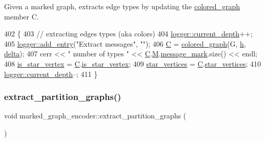 Given a marked graph, extracts edge types by updating the \hyperlink{classcolored__graph}{colored\+\_\+graph} member C. 


\begin{DoxyCode}
402 \{
403   \textcolor{comment}{// extracting edges types (aka colors)}
404   \hyperlink{classlogger_a9d29b49bd318a719a8e85b59eac54fe0}{logger::current\_depth}++;
405   \hyperlink{classlogger_a710163deb17bc81f70d53d285b8ac9ac}{logger::add\_entry}(\textcolor{stringliteral}{"Extract messages"}, \textcolor{stringliteral}{""});
406   \hyperlink{classmarked__graph__encoder_af82bc0653414091291cb75553a407bdb}{C} = \hyperlink{classcolored__graph}{colored\_graph}(G, \hyperlink{classmarked__graph__encoder_ae7f8872c57d2d64e4ca6cc47387b9b58}{h}, \hyperlink{classmarked__graph__encoder_a29dcf42526b12cf7964a556bb1025c9b}{delta});
407   cerr << \textcolor{stringliteral}{" number of types "} << \hyperlink{classmarked__graph__encoder_af82bc0653414091291cb75553a407bdb}{C}.\hyperlink{classcolored__graph_ab72c568fe12f7c849ca6bffb145aec47}{M}.\hyperlink{classgraph__message_a49d9af5150daf0599c29fe18cb032fa5}{message\_mark}.size() << endl;
408   \hyperlink{classmarked__graph__encoder_ac36f6c2430af6fa4d20584569859bb59}{is\_star\_vertex} = \hyperlink{classmarked__graph__encoder_af82bc0653414091291cb75553a407bdb}{C}.\hyperlink{classcolored__graph_ad41163e970530c7e45878d299f0dc961}{is\_star\_vertex};
409   \hyperlink{classmarked__graph__encoder_a08fdf6fcd7dcd8c5d1667f2d7ff06c2c}{star\_vertices} = \hyperlink{classmarked__graph__encoder_af82bc0653414091291cb75553a407bdb}{C}.\hyperlink{classcolored__graph_ab7ee8d717abde7ad7467ef695038f574}{star\_vertices};
410   \hyperlink{classlogger_a9d29b49bd318a719a8e85b59eac54fe0}{logger::current\_depth}--;
411 \}
\end{DoxyCode}
\mbox{\label{classmarked__graph__encoder_a60b0038c57bd8fa2f5cb3f0b6999c4f3}} 
\subsubsection{\texorpdfstring{extract\+\_\+partition\+\_\+graphs()}{extract\_partition\_graphs()}}
{\footnotesize\ttfamily void marked\+\_\+graph\+\_\+encoder\+::extract\+\_\+partition\+\_\+graphs (\begin{DoxyParamCaption}{ }\end{DoxyParamCaption})\hspace{0.3cm}{\ttfamily [private]}}



